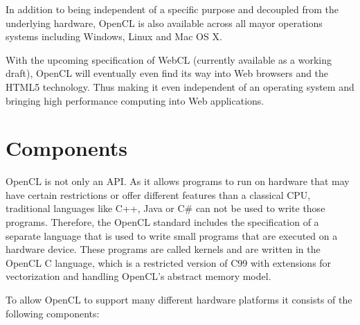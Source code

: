 In addition to being independent of a specific purpose and decoupled from the underlying hardware, OpenCL is also available across all mayor operations systems including Windows, Linux and Mac OS X.

With the upcoming specification of WebCL (currently available as a working draft), OpenCL will eventually even find its way into Web browsers and the HTML5 technology. Thus making it even independent of an operating system and bringing high performance computing into Web applications.

\section{Components}

OpenCL is not only an API. As it allows programs to run on hardware that may have certain restrictions or offer different features than a classical CPU, traditional languages like C++, Java or C\# can not be used to write those programs. Therefore, the OpenCL standard includes the specification of a separate language that is used to write small programs that are executed on a hardware device. These programs are called kernels and are written in the OpenCL C language, which is a restricted version of C99 with extensions for vectorization and handling OpenCL's abstract memory model.

\pagebreak

To allow OpenCL to support many different hardware platforms it consists of the following components:

